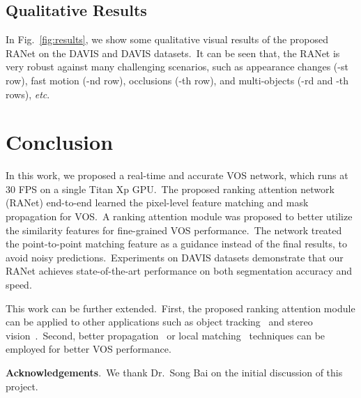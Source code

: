 \documentclass[10pt,twocolumn,letterpaper]{article}
\newcommand{\bigsize}{\fontsize{9.8pt}{10pt}\selectfont}
\begin{document}
\subsection{Qualitative Results}
\label{sec:visual}
In Fig.~\ref{fig:results}, we show some qualitative visual results of the proposed RANet on the DAVIS and DAVIS datasets.\ It can be seen that, the RANet is very robust against many challenging scenarios, such as appearance changes (-st row), fast motion (-nd row), occlusions (-th row), and multi-objects (-rd and -th rows), \textit{etc}.\





\section{Conclusion}

In this work, we proposed a real-time and accurate VOS network, which runs at 30 FPS on a single Titan Xp GPU.\ The proposed ranking attention network (RANet) end-to-end learned the pixel-level feature matching and mask propagation for VOS.\ A ranking attention module was proposed to better utilize the similarity features for fine-grained VOS performance.\ The network treated the point-to-point matching feature as a guidance instead of the final results, to avoid noisy predictions.\ Experiments on DAVIS datasets demonstrate that our RANet achieves state-of-the-art performance on both segmentation accuracy and speed.

This work can be further extended.\ First, the proposed ranking attention module can be applied to other applications such as object tracking~\cite{siammask} and stereo vision~\cite{Khamis2018StereoNet}.\ Second, better propagation~\cite{flownet, flownet2} or local matching~\cite{Voigtlaender2019FEELVOS} techniques can be employed for better VOS performance.

\vspace{2mm}
\noindent
\textbf{Acknowledgements}.\
We thank Dr.\ Song Bai on the initial discussion of this project.


\clearpage
{
\balance
\bigsize

}
\end{document}
